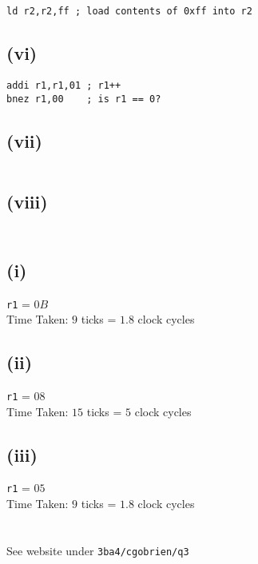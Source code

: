 \documentclass[a4paper,12pt]{article}
\begin{document}
\begin{verbatim}
ld r2,r2,ff ; load contents of 0xff into r2
\end{verbatim}

\subsection*{(vi)}

\begin{verbatim}
addi r1,r1,01 ; r1++
bnez r1,00    ; is r1 == 0?
\end{verbatim}

\subsection*{(vii)}

\begin{verbatim}
\end{verbatim}

\subsection*{(viii)}

\begin{verbatim}
\end{verbatim}

\section{}

\subsection*{(i)}

\verb!r1! = $0B$ \\
Time Taken: $9$ ticks = $1.8$ clock cycles

\subsection*{(ii)}

\verb!r1! = $08$ \\
Time Taken: $15$ ticks = $5$ clock cycles

\subsection*{(iii)}

\verb!r1! = $05$ \\
Time Taken: $9$ ticks = $1.8$ clock cycles

\section{}

See website under \verb!3ba4/cgobrien/q3!
\end{document}
